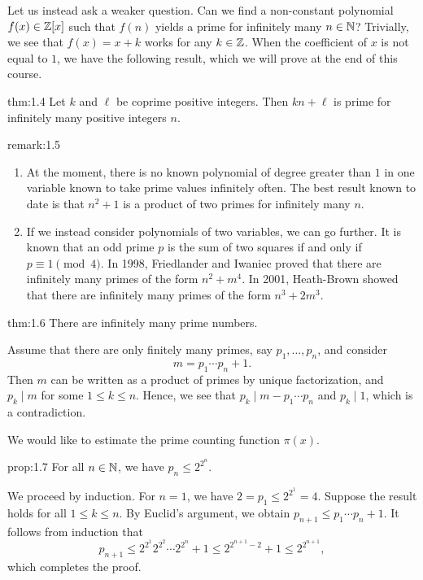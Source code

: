 Let us instead ask a weaker question. Can we find a non-constant polynomial $f(x) \in \mathbb{Z}[x]$ such that 
$f(n)$ yields a prime for infinitely many $n \in \mathbb{N}$? Trivially, we see that $f(x) = x+k$ works 
for any $k \in \mathbb{Z}$. When the coefficient of $x$ is not equal to $1$, we have the following result, 
which we will prove at the end of this course.

\begin{theo}[Dirichlet]{thm:1.4}
Let $k$ and $\ell$ be coprime positive integers. Then $kn+\ell$ is prime for infinitely many positive
integers $n$. 
\end{theo}

\begin{remark}{remark:1.5}
\begin{enumerate}[(1)]
    \item At the moment, there is no known polynomial of degree greater than $1$ in one variable 
    known to take prime values infinitely often. The best result known to date is that $n^2+1$ is 
    a product of two primes for infinitely many $n$.
    \item If we instead consider polynomials of two variables, we can go further. It is known that 
    an odd prime $p$ is the sum of two squares if and only if $p \equiv 1 \pmod 4$. 
    In 1998, Friedlander and Iwaniec proved that there are infinitely many primes of the 
    form $n^2 + m^4$. In 2001, Heath-Brown showed that there are infinitely many primes of 
    the form $n^3 + 2m^3$. 
\end{enumerate}
\end{remark}

\begin{theo}[Euclid]{thm:1.6}
There are infinitely many prime numbers.
\end{theo}
\begin{pf}
Assume that there are only finitely many primes, say $p_1, \dots, p_n$, and consider 
\[ m = p_1 \cdots p_n + 1. \]
Then $m$ can be written as a product of primes by unique factorization, and $p_k \mid m$ for some $1 \leq
k \leq n$. 
Hence, we see that $p_k \mid m - p_1 \cdots p_n$ and $p_k \mid 1$, which is a contradiction. 
\end{pf}

We would like to estimate the prime counting function $\pi(x)$. 

\begin{prop}{prop:1.7}
For all $n \in \mathbb{N}$, we have $p_n \leq 2^{2^n}$. 
\end{prop}
\begin{pf}
We proceed by induction. For $n = 1$, we have $2 = p_1 \leq 2^{2^1} = 4$. Suppose the result 
holds for all $1 \leq k \leq n$. By Euclid's argument, we obtain $p_{n+1} \leq p_1 \cdots p_n + 1$. 
It follows from induction that 
\[ p_{n+1} \leq 2^{2^1} 2^{2^2} \cdots 2^{2^n} + 1 \leq 2^{2^{n+1}-2} + 1 \leq 2^{2^{n+1}}, \]
which completes the proof. 
\end{pf}

